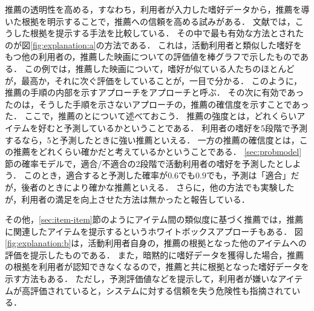 推薦の透明性を高める，すなわち，利用者が入力した嗜好データから，推薦を導いた根拠を明示することで，推薦への信頼を高める試みがある．
文献\cite{cscw:00:01}では，こうした根拠を提示する手法を比較している．
その中で最も有効な方法とされたのが図\ref{fig:explanation:a}の方法である．
これは，活動利用者と類似した嗜好をもつ他の利用者の，推薦した映画についての評価値を棒グラフで示したものである．
この例では，推薦した映画について，嗜好が似ている人たちのほとんどが，最高か，それに次ぐ評価をしていることが，一目で分かる．
このように，推薦の手順の内部を示すアプローチをアプローチと呼ぶ．
その次に有効であったのは，そうした手順を示さないアプローチの，推薦の確信度を示すことであった．
ここで，推薦のとについて述べておこう．
推薦の強度とは，どれくらいアイテムを好むと予測しているかということである．
利用者の嗜好を5段階で予測するなら，5と予測したときに強い推薦といえる．
一方の推薦の確信度とは，この推薦をどれくらい確かだと考えているかということである．
\ref{sec:probmodel}節の確率モデルで，適合/不適合の2段階で活動利用者の嗜好を予測したとしよう．
このとき，適合すると予測した確率が$0.6$でも$0.9$でも，予測は「適合」だが，後者のときにより確かな推薦といえる．
さらに，他の方法でも実験したが，利用者の満足を向上させた方法は無かったと報告している．

その他，\ref{sec:item-item}節のようにアイテム間の類似度に基づく推薦では，推薦に関連したアイテムを提示するというホワイトボックスアプローチもある．
図\ref{fig:explanation:b}は，活動利用者自身の，推薦の根拠となった他のアイテムへの評価を提示したものである．
また，暗黙的に嗜好データを獲得した場合，推薦の根拠を利用者が認知できなくなるので，推薦と共に根拠となった嗜好データを示す方法もある．
ただし，予測評価値などを提示して，利用者が嫌いなアイテムが高評価されていると，システムに対する信頼を失う危険性も指摘されている\cite{sigir:01:01}．
